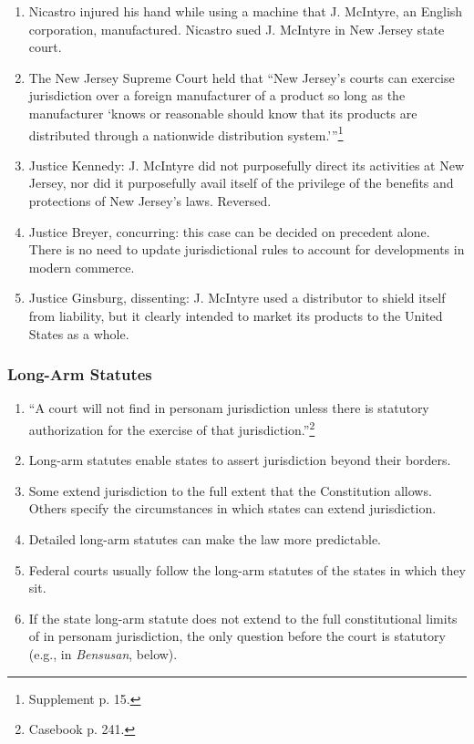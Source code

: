 \begin{enumerate}
    \item Nicastro injured his hand while using a machine that J. McIntyre, an 
    English corporation, manufactured. Nicastro sued J. McIntyre in New Jersey 
    state court. 
    \item The New Jersey Supreme Court held that \enquote{New Jersey's courts can 
    exercise jurisdiction over a foreign manufacturer of a product so long as 
    the manufacturer \enquote{knows or reasonable should know that its products are 
    distributed through a nationwide distribution 
    system.}}\footnote{Supplement p. 15.}
    \item Justice Kennedy: J. McIntyre did not purposefully direct its 
    activities at New Jersey, nor did it purposefully avail itself of the 
    privilege of the benefits and protections of New Jersey's laws. Reversed.
    \item Justice Breyer, concurring: this case can be decided on precedent 
    alone. There is no need to update jurisdictional rules to account for 
    developments in modern commerce.
    \item Justice Ginsburg, dissenting: J. McIntyre used a distributor to 
    shield itself from liability, but it clearly intended to market its 
    products to the United States as a whole.
\end{enumerate}

\subsubsection{Long-Arm Statutes}

\begin{enumerate}
    \item ``A court will not find in personam jurisdiction unless there is 
    statutory authorization for the exercise of that 
    jurisdiction.''\footnote{Casebook p. 241.}
    \item Long-arm statutes enable states to assert jurisdiction beyond their 
    borders.
    \item Some extend jurisdiction to the full extent that the Constitution 
    allows. Others specify the circumstances in which states can extend 
    jurisdiction.
    \item Detailed long-arm statutes can make the law more predictable.
    \item Federal courts usually follow the long-arm statutes of the states in 
    which they sit.
    \item If the state long-arm statute does not extend to the full 
    constitutional limits of in personam jurisdiction, the only question 
    before the court is statutory (e.g., in \emph{Bensusan}, below).
\end{enumerate}

